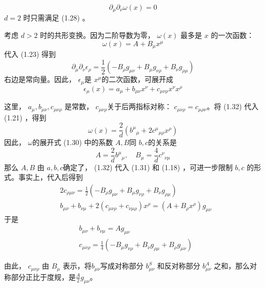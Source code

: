 \begin{equation}
	\partial_{\mu} \partial_{\nu} \omega(x)=0
\end{equation}
$d=2$ 时只需满足 (1.28) 。

考虑 $d>2$ 时的共形变换。因为二阶导数为零， $\omega(x)$ 最多是 $x$ 的一次函数：
\begin{equation}
	\omega(x)=A+B_{\mu} x^{\mu}
\end{equation}
代入 (1.23) 得到
\begin{equation}
		\partial_{\mu} \partial_{\nu} \epsilon_{\rho}=\frac{1}{2}\left(-B_{\rho} g_{\mu \nu}+B_{\mu} g_{\nu \rho}+B_{\nu} g_{\rho \mu}\right)
\end{equation}
右边是常向量。因此， $\epsilon_\mu $是 $x^\mu $的二次函数，可展开成
\begin{equation}
		\epsilon_{\mu}(x)=a_{\mu}+b_{\mu \nu} x^{\nu}+c_{\mu \nu \rho} x^{\nu} x^{\rho}
\end{equation}

这里， $a_\mu,b_{\mu\nu},c_{\mu\nu\rho}$ 是常数， $c_{\mu\nu\rho} $关于后两指标对称： $c_{\mu \nu \rho}=c_{\mu \rho \nu} $。将 (1.32) 代入 (1.21) ，得到
\begin{equation}
		\omega(x)=\frac{2}{d}\left(b^{\mu}{}_{\mu}+2 c^{\mu}{}_{\mu \rho} x^{\rho}\right)
\end{equation}
因此， $\omega $的展开式 (1.30) 中的系数 $A,B $同 $b,c $的关系是
\begin{equation}
	A=\frac{2}{d} b^{\mu}{}_{\mu}, \quad B_{\mu}=\frac{4}{d} c^{\nu}{}_{\nu \mu}
\end{equation}
那么 $A,B$ 由 $a,b,c $确定了， (1.32) 代入 (1.31) 和 (1.18) ，可进一步限制 $b,c$ 的形式。事实上，代入后得到
	\begin{align} &2 c_{\rho \mu \nu}=\frac{1}{2}\left(-B_{\rho} g_{\mu \nu}+B_{\mu} g_{\nu \rho}+B_{\nu} g_{\rho \mu}\right)\\ &b_{\mu \nu}+b_{\nu \mu}+2\left(c_{\mu \nu \rho}+c_{\nu \mu \rho}\right) x^{\rho}=\left(A+B_{\rho} x^{\rho}\right) g_{\mu \nu} \end{align}
于是
		\begin{align} &b_{\mu \nu}+b_{\nu \mu}=A g_{\mu \nu}\\ &c_{\mu \nu \rho}=\frac{1}{4}\left(-B_{\mu} g_{\nu \rho}+B_{\nu} g_{\rho \mu}+B_{\rho} g_{\mu \nu}\right) \end{align}

由此， $c_{\mu\nu\rho}$ 由 $B_\mu$ 表示，将$ b_{\mu\nu}$写成对称部分 $b_{\mu\nu}^S$ 和反对称部分 $b_{\mu\nu}^A$ 之和，那么对称部分正比于度规，是$ \frac{A}{2} g_{\mu \nu} $。

